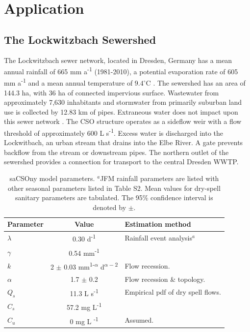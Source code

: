 \documentclass{agujournal2018}
\begin{document}
\section{Application}
\subsection{The Lockwitzbach Sewershed}
The Lockwitzbach sewer network, located in Dresden, Germany has a mean annual rainfall of 665 mm a\textsuperscript{-1} (1981-2010), a potential evaporation rate of 605 mm a\textsuperscript{-1} and a mean annual temperature of $9.4^\circ$C \citep{DWetter}. The sewershed has an area of 144.3 ha, with 36 ha of connected impervious surface. Wastewater from approximately 7,630 inhabitants and stormwater from primarily suburban land use is collected by 12.83 km of pipes. Extraneous water does not impact upon this sewer network \cite{Karpf_2011}. The CSO structure operates as a sidef\/low weir with a f\/low threshold of approximately 600 L s\textsuperscript{-1}. Excess water is discharged into the Lockwitbach, an urban stream that drains into the Elbe River. A gate prevents backf\/low from the stream or downstream pipes. The northern outlet of the sewershed provides a connection for transport to the central Dresden WWTP. 

\begin{table}[htb]
 \caption{saCSOny model parameters. $^{a}$JFM rainfall parameters are listed with other seasonal parameters listed in Table S2. Mean values for dry-spell sanitary parameters are tabulated. The 95\% conf\/idence interval is denoted by $\pm$.}
  \label{tab:one}
 \centering
 \begin{tabular}{l c l}
 \hline
  Parameter  & Value & Estimation method  \\
 \hline
   $\lambda$  & 0.30 d\textsuperscript{-1} & Rainfall event analysis$^{a}$\\
   $\gamma$  & 0.54 mm\textsuperscript{-1}  &\\
   $k$  & 2 $\pm$ 0.03 mm\textsuperscript{1-$\alpha$} d\textsuperscript{$\alpha-2$}  &  Flow recession.\\
   $\alpha$  & 1.7 $\pm$ 0.2 & Flow recession \& topology.  \\
  $Q_s$  & 11.3 L s\textsuperscript{-1}  & Empirical pdf of dry spell f\/lows.\\
   $C_s$  & 57.2 mg L\textsuperscript{-1} &   \\
   $C_u$ & 0 mg L \textsuperscript{-1} & Assumed.\\
 \hline
 \end{tabular}
 \end{table}
\end{document}
